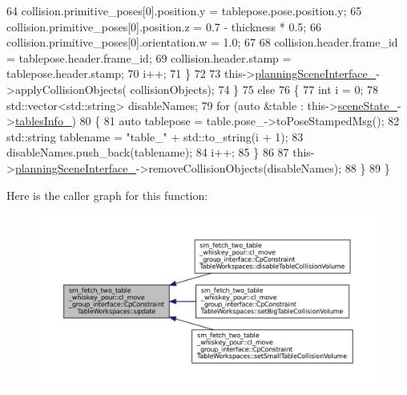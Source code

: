 \begin{DoxyCode}
64                     collision.primitive\_poses[0].position.y = tablepose.pose.position.y;
65                     collision.primitive\_poses[0].position.z = 0.7 - thickness * 0.5;
66                     collision.primitive\_poses[0].orientation.w = 1.0;
67 
68                     collision.header.frame\_id = tablepose.header.frame\_id;
69                     collision.header.stamp = tablepose.header.stamp;
70                     i++;
71                 \}
72 
73                 this->\hyperlink{classsm__fetch__two__table__whiskey__pour_1_1cl__move__group__interface_1_1CpConstraintTableWorkspaces_a4697e55cb356020c4c7fa6b45c8b6f67}{planningSceneInterface\_}->applyCollisionObjects(
      collisionObjects);
74             \}
75             \textcolor{keywordflow}{else}
76             \{
77                 \textcolor{keywordtype}{int} i = 0;
78                 std::vector<std::string> disableNames;
79                 \textcolor{keywordflow}{for} (\textcolor{keyword}{auto} &table : this->\hyperlink{classsm__fetch__two__table__whiskey__pour_1_1cl__move__group__interface_1_1CpConstraintTableWorkspaces_a394e5c69c84b395bae91b0eafcb7342b}{sceneState\_}->\hyperlink{classsm__fetch__two__table__whiskey__pour_1_1cl__perception__system_1_1CpSceneState_a5d6fd3eb480fbb9a241c44ddd42c2930}{tablesInfo\_})
80                 \{
81                     \textcolor{keyword}{auto} tablepose = table.pose\_->toPoseStampedMsg();
82                     std::string tablename = \textcolor{stringliteral}{"table\_"} + std::to\_string(i + 1);
83                     disableNames.push\_back(tablename);
84                     i++;
85                 \}
86 
87                 this->\hyperlink{classsm__fetch__two__table__whiskey__pour_1_1cl__move__group__interface_1_1CpConstraintTableWorkspaces_a4697e55cb356020c4c7fa6b45c8b6f67}{planningSceneInterface\_}->removeCollisionObjects(disableNames);
88             \}
89         \}
\end{DoxyCode}
Here is the caller graph for this function\+:
\nopagebreak
\begin{figure}[H]
\begin{center}
\leavevmode
\includegraphics[width=350pt]{classsm__fetch__two__table__whiskey__pour_1_1cl__move__group__interface_1_1CpConstraintTableWorkspaces_a7c8e7186aff561f2a1721145814add82_icgraph}
\end{center}
\end{figure}


